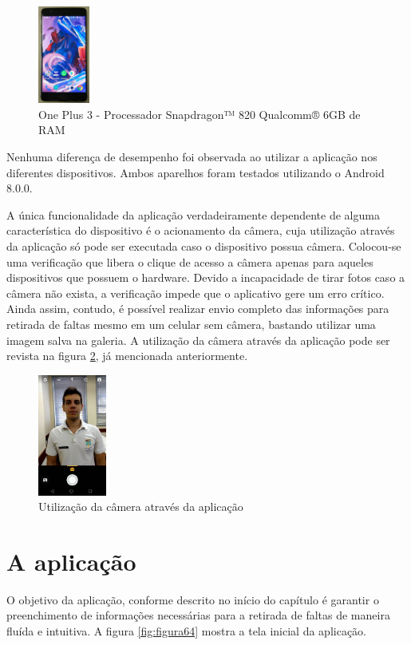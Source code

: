 \begin{figure}[!ht]
	\centering
\includegraphics[width=0.15\textwidth]{img/Oneplus3.jpg}
	\caption{One Plus 3 - Processador Snapdragon™ 820 Qualcomm® 6GB de RAM}
	\label{fig:figura63}
\end{figure}

Nenhuma diferença de desempenho foi observada ao utilizar a aplicação nos diferentes dispositivos. Ambos aparelhos foram testados utilizando o Android 8.0.0. 

A única funcionalidade da aplicação verdadeiramente dependente de alguma característica do dispositivo é o acionamento da câmera, cuja utilização através da aplicação só pode ser executada caso o dispositivo possua câmera. Colocou-se uma verificação que libera o clique de acesso a câmera apenas para aqueles dispositivos que possuem o hardware. Devido a incapacidade de tirar fotos caso a câmera não exista, a verificação impede que o aplicativo gere um erro crítico. Ainda assim, contudo, é possível realizar envio completo das informações para retirada de faltas mesmo em um celular sem câmera, bastando utilizar uma imagem salva na galeria. A utilização da câmera através da aplicação pode ser revista na figura \ref{fig:figura59}, já mencionada anteriormente.

\begin{figure}[!ht]
	\centering
\includegraphics[width=0.2\textwidth]{img/camera_1.jpeg}   
	\caption{Utilização da câmera através da aplicação}
	\label{fig:figura59}
\end{figure}

\newpage
\section{A aplicação}
O objetivo da aplicação, conforme descrito no início do capítulo é garantir o preenchimento de informações necessárias para a retirada de faltas de maneira fluída e intuitiva. A figura \ref{fig:figura64} mostra a tela inicial da aplicação.


